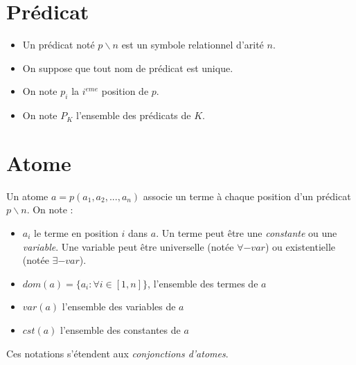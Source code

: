 
\section{Pr\'edicat}\label{def_predicat}
\begin{itemize}
	\item Un pr\'edicat not\'e $p \backslash n$ est un symbole relationnel d'arit\'e $n$.
	\item On suppose que tout nom de pr\'edicat est unique.
	\item On note $p_{i}$ la $i^{eme}$ position de $p$.
	\item On note $P_{K}$ l'ensemble des pr\'edicats de $K$.
\end{itemize}

\section{Atome}\label{def_atome}
Un atome $a = p(a_{1},a_{2},...,a_{n})$ associe un terme \`a chaque position d'un pr\'edicat $p \backslash n$.
On note :
\begin{itemize}
	\item $a_{i}$ le terme en position $i$ dans $a$. Un terme peut \^etre une {\em constante} 
	ou une {\em variable}.
	Une variable peut \^etre universelle (not\'ee $\forall-var$) ou existentielle (not\'ee 
	$\exists-var$).
	\item $dom(a) = \{a_{i} : \forall i \in [1,n]\}$, l'ensemble des termes de $a$
	\item $var(a)$ l'ensemble des variables de $a$
	\item $cst(a)$ l'ensemble des constantes de $a$
\end{itemize}
Ces notations s'\'etendent aux {\em conjonctions d'atomes}.


